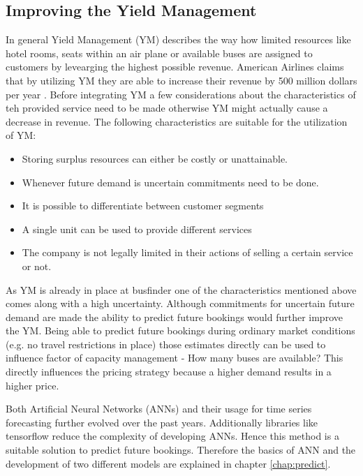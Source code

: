 \subsection{Improving the Yield Management}
In general Yield Management (YM) describes the way how limited resources like hotel rooms, seats within an air plane or available buses are assigned to customers by levearging the highest possible revenue. American Airlines claims that by utilizing YM they are able to increase their revenue by 500 million dollars per year \cite{ym_practice}. Before integrating YM a few considerations about the characteristics of teh provided service need to be made otherwise YM might actually cause a decrease in revenue. The following characteristics are suitable for the utilization of YM:\cite{ym_practice}
\begin{itemize}
  \item Storing surplus resources can either be costly or unattainable. 
  \item Whenever future demand is uncertain commitments need to be done.
  \item It is possible to differentiate between customer segments
  \item A single unit can be used to provide different services 
  \item The company is not legally limited in their actions of selling a certain service or not.
\end{itemize}
As YM is already in place at busfinder one of the characteristics mentioned above comes along with a high uncertainty. Although commitments for uncertain future demand are made the ability to predict future bookings would further improve the YM. Being able to predict future bookings during ordinary market conditions (e.g. no travel restrictions in place) those estimates directly can be used to influence factor of capacity management - How many buses are available? This directly influences the pricing strategy because a higher demand results in a higher price.

Both Artificial Neural Networks (ANNs) and their usage for time series forecasting further evolved over the past years. Additionally libraries like tensorflow  reduce the complexity of developing ANNs. Hence this method is a suitable solution to predict future bookings. Therefore the basics of ANN and the development of two different models are explained in chapter \ref{chap:predict}.


